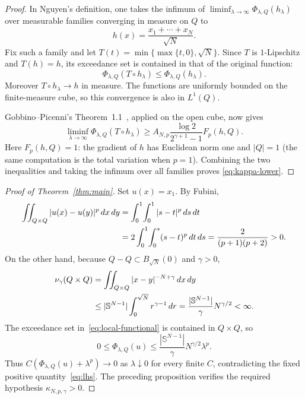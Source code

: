 \documentclass[11pt]{article}
\newcommand{\Sph}{\mathbb{S}}
\begin{document}
\begin{proof}
In Nguyen's definition, one takes the infimum of
$\liminf_{\lambda\to\infty}\Phi_{\lambda,Q}(h_\lambda)$ over measurable
families converging in measure on $Q$ to
\[
 h(x)=\frac{x_1+\cdots+x_N}{\sqrt N}.
\]
Fix such a family and let
$T(t)=\min\{\max\{t,0\},\sqrt N\}$.  Since $T$ is $1$-Lipschitz and
$T(h)=h$, its exceedance set is contained in that of the original function:
\[
 \Phi_{\lambda,Q}(T\circ h_\lambda)
 \le \Phi_{\lambda,Q}(h_\lambda).
\]
Moreover $T\circ h_\lambda\to h$ in measure.  The functions are uniformly
bounded on the finite-measure cube, so this convergence is also in $L^1(Q)$.

Gobbino--Picenni's Theorem~1.1~\cite{GobbinoPicenni}, applied on the open cube,
now gives
\[
 \liminf_{\lambda\to\infty}
 \Phi_{\lambda,Q}(T\circ h_\lambda)
 \ge A_{N,p}\frac{\log2}{2^{\gamma+1}-1}F_p(h,Q).
\]
Here $F_p(h,Q)=1$: the gradient of $h$ has Euclidean norm one and $|Q|=1$
(the same computation is the total variation when $p=1$).  Combining the two
inequalities and taking the infimum over all families proves
\eqref{eq:kappa-lower}.
\end{proof}

\begin{proof}[Proof of Theorem~\ref{thm:main}]
Set $u(x)=x_1$.  By Fubini,
\begin{align}\label{eq:lhs}
 \iint_{Q\times Q}|u(x)-u(y)|^p\,dx\,dy
 &=\int_0^1\!\int_0^1|s-t|^p\,ds\,dt\\
 &=2\int_0^1\!\int_0^s(s-t)^p\,dt\,ds
 =\frac{2}{(p+1)(p+2)}>0.\notag
\end{align}
On the other hand, because $Q-Q\subset B_{\sqrt N}(0)$ and $\gamma>0$,
\begin{align}\label{eq:kernel}
 \nu_\gamma(Q\times Q)
 &=\iint_{Q\times Q}|x-y|^{-N+\gamma}\,dx\,dy\\
 &\le |\Sph^{N-1}|\int_0^{\sqrt N}r^{\gamma-1}\,dr
 =\frac{|\Sph^{N-1}|}{\gamma}N^{\gamma/2}<\infty.\notag
\end{align}
The exceedance set in~\eqref{eq:local-functional} is contained in $Q\times Q$,
so
\begin{equation}\label{eq:vanish}
 0\le\Phi_{\lambda,Q}(u)
 \le \frac{|\Sph^{N-1}|}{\gamma}N^{\gamma/2}\lambda^p.
\end{equation}
Thus $C(\Phi_{\lambda,Q}(u)+\lambda^p)\to0$ as
$\lambda\downarrow0$ for every finite $C$, contradicting the fixed positive
quantity~\eqref{eq:lhs}.  The preceding proposition verifies the required
hypothesis $\kappa_{N,p,\gamma}>0$.
\end{proof}
\end{document}

